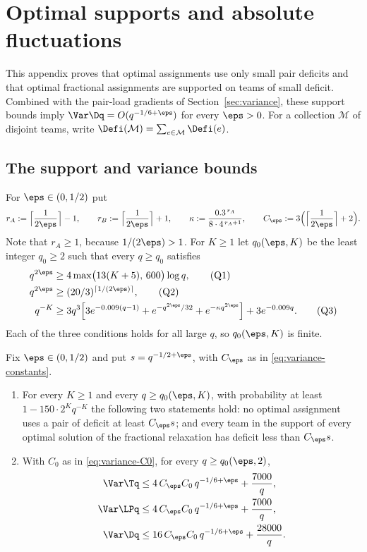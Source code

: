 \section{Optimal supports and absolute fluctuations}\label{sec:variance-localization}

This appendix proves that optimal assignments use only small pair deficits and
that optimal fractional assignments are supported on teams of small deficit.
Combined with the pair-load gradients of Section~\ref{sec:variance}, these
support bounds imply $\Var\Dq=O(q^{-1/6+\eps})$ for every $\eps>0$.
For a collection $\mathcal M$ of disjoint teams, write
$\Defi(\mathcal M)=\sum_{e\in\mathcal M}\Defi(e)$.

\subsection{The support and variance bounds}

For $\eps\in(0,1/2)$ put
\begin{equation}\label{eq:variance-constants}
r_A:=\Bigl\lceil\frac1{2\eps}\Bigr\rceil-1,\qquad
r_B:=\Bigl\lceil\frac1{2\eps}\Bigr\rceil+1,\qquad
\kappa:=\frac{0.3^{\,r_A}}{8\cdot4^{\,r_A+1}},\qquad
C_\eps:=3\Bigl(\Bigl\lceil\frac1{2\eps}\Bigr\rceil+2\Bigr).
\end{equation}
Note that $r_A\ge1$, because $1/(2\eps)>1$. For $K\ge1$ let $q_0(\eps,K)$ be the least
integer $q_0\ge2$ such that every $q\ge q_0$ satisfies
\begin{align}
q^{2\eps}&\ge 4\max\bigl(13(K+5),\,600\bigr)\log q, \tag{Q1}\label{eq:variance-Q1}\\
q^{2\eps}&\ge (20/3)^{\lceil 1/(2\eps)\rceil}, \tag{Q2}\label{eq:variance-Q2}\\
q^{-K}&\ge 3q^3\Bigl[3e^{-0.009(q-1)}+e^{-q^{2\eps}/32}+e^{-\kappa q^{2\eps}}\Bigr]
        +3e^{-0.009q}. \tag{Q3}\label{eq:variance-Q3}
\end{align}
Each of the three conditions holds for all large $q$, so $q_0(\eps,K)$ is finite.

\begin{theorem}\label{thm:variance}
Fix $\eps\in(0,1/2)$ and put $s=q^{-1/2+\eps}$, with $C_\eps$ as in
\eqref{eq:variance-constants}.
\begin{enumerate}
\item[\textup{(i)}] For every $K\ge1$ and every $q\ge q_0(\eps,K)$, with probability at
least $1-150\cdot2^K q^{-K}$ the following two statements hold: no optimal assignment uses
a pair of deficit at least $C_\eps s$; and every team in the support of every optimal
solution of the fractional relaxation has deficit less than $C_\eps s$.
\item[\textup{(ii)}] With $C_0$ as in \eqref{eq:variance-C0}, for every
$q\ge q_0(\eps,2)$,
\begin{align*}
\Var\Tq&\le 4\,C_\eps C_0\,q^{-1/6+\eps}+\frac{7000}{q},\\
\Var\LPq&\le 4\,C_\eps C_0\,q^{-1/6+\eps}+\frac{7000}{q},\\
\Var\Dq&\le 16\,C_\eps C_0\,q^{-1/6+\eps}+\frac{28000}{q}.
\end{align*}
\end{enumerate}
\end{theorem}

